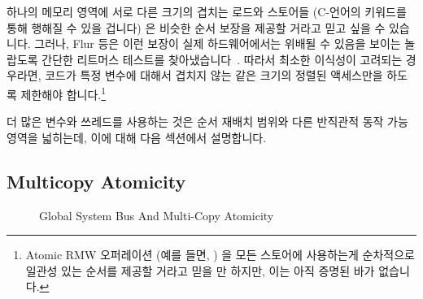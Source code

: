 하나의 메모리 영역에 서로 다른 크기의 겹치는 로드와 스토어들 (C-언어의
 키워드를 통해 행해질 수 있을 겁니다) 은 비슷한 순서 보장을 제공할
거라고 믿고 싶을 수 있습니다.
그러나, Flur 등은 이런 보장이 실제 하드웨어에서는 위배될 수 있음을 보이는
놀랍도록 간단한 리트머스 테스트를
찾아냈습니다~\cite{Flur:2017:MCA:3093333.3009839}.
따라서 최소한 이식성이 고려되는 경우라면, 코드가 특정 변수에 대해서 겹치지 않는
같은 크기의 정렬된 액세스만을 하도록 제한해야 합니다.\footnote{
	Atomic RMW 오퍼레이션 (예를 들면, ) 을 모든 스토어에
	사용하는게 순차적으로 일관성 있는 순서를 제공할 거라고 믿을 만 하지만,
	이는 아직 증명된 바가 없습니다.}

더 많은 변수와 쓰레드를 사용하는 것은 순서 재배치 범위와 다른 반직관적 동작
가능 영역을 넓히는데, 이에 대해 다음 섹션에서 설명합니다.

\subsection{Multicopy Atomicity}
\label{sec:memorder:Multicopy Atomicity}

\begin{figure}[tb]
\centering
{}
\caption{Global System Bus And Multi-Copy Atomicity}
\label{fig:memorder:Global System Bus And Multi-Copy Atomicity}
\end{figure}


